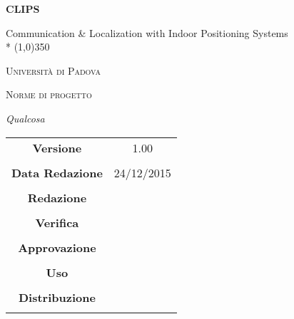 \documentclass[a4paper,12pt]{article}
\author{Nome Autore}
\date{05/01/2016}
\begin{document}
\begin{titlepage}
	\centering
	{\huge\bfseries CLIPS\par}
	Communication \& Localization with Indoor Positioning Systems \\*
	\line(1,0){350} \\
	{\scshape\LARGE Università di Padova \par}
	\vspace{1cm}
	{\scshape\Large Norme di progetto\par}
	\vspace{1.5cm}
	
	\vspace{2cm}
	{\Large\itshape Qualcosa\par}
	
	\vfill \vfill
	\begin{tabular}{c|c}
		{\hfill \textbf{Versione}} 			& 1.00				\\ \\
		{\hfill\textbf{Data Redazione}} 		& 24/12/2015  		\\ \\
		{\hfill\textbf{Redazione}} 			&  					\\ \\
		{\hfill\textbf{Verifica}} 				&  					\\ \\
		{\hfill\textbf{Approvazione}} 		&  					\\ \\
		{\hfill\textbf{Uso}} 					& 					\\ \\
		{\hfill\textbf{Distribuzione}} 			& 					\\ \\
	\end{tabular}
\end{titlepage}
	
	\newpage

	\tableofcontents
	
	\label{LastFrontPage}
	

	\newpage
	
	\pagestyle{mymain}
	
	\newpage
		

	\newpage
		
	
	\newpage
		
	
	\newpage
		
		
	\newpage
		
	
	\newpage
		
		
	\label{LastPage}
\end{document}
